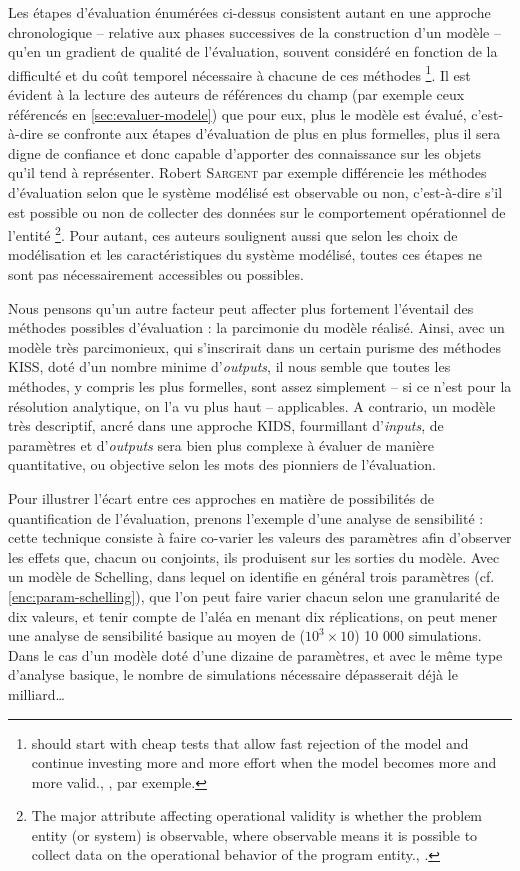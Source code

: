 Les étapes d'évaluation énumérées ci-dessus consistent autant en une approche chronologique -- relative aux phases successives de la construction d'un modèle -- qu'en un gradient de qualité de l'évaluation, souvent considéré en fonction de la difficulté et du coût temporel nécessaire à chacune de ces méthodes
\footnote{
	\og [One] should start with cheap tests that allow fast rejection of the model and continue investing more and more effort when the model becomes more and more valid.\fg{}, \textcite[42]{klugl_validation_2008}, par exemple.
}.
Il est évident à la lecture des auteurs de références du champ (par exemple ceux référencés en \cref{sec:evaluer-modele}) que pour eux, \og plus\fg{} le modèle est évalué, c'est-à-dire se confronte aux étapes d'évaluation de plus en plus formelles, plus il sera digne de confiance et donc capable d'apporter des connaissance sur les objets qu'il tend à représenter.
Robert \textsc{Sargent} par exemple différencie les méthodes d'évaluation selon que le système modélisé est observable ou non, c'est-à-dire \og s'il est possible ou non de collecter des données sur le comportement opérationnel de l'entité \fg{}
\footnote{
	\og The major attribute affecting operational validity is whether the problem entity (or system) is observable, where observable means it is possible to collect data on the operational behavior of the program entity.\fg{}, \textcite[6]{sargent2009verification}.
}.
Pour autant, ces auteurs soulignent aussi que selon les choix de modélisation et les caractéristiques du système modélisé, toutes ces étapes ne sont pas nécessairement accessibles ou possibles.

Nous pensons qu'un autre facteur peut affecter plus fortement l'éventail des méthodes possibles d'évaluation : la parcimonie du modèle réalisé.
Ainsi, avec un modèle très parcimonieux, qui s'inscrirait dans un certain purisme des méthodes \og KISS\fg{}, doté d'un nombre minime d'\textit{outputs}, il nous semble que toutes les méthodes, y compris les plus formelles, sont assez simplement -- si ce n'est pour la résolution analytique, on l'a vu plus haut -- applicables.
A contrario, un modèle très descriptif, ancré dans une approche \og KIDS\fg{}, fourmillant d'\textit{inputs}, de paramètres et d'\textit{outputs} sera bien plus complexe à évaluer de manière quantitative, ou \og objective\fg{} selon les mots des pionniers de l'évaluation.

Pour illustrer l'écart entre ces approches en matière de possibilités de quantification de l'évaluation, prenons l'exemple d'une analyse de sensibilité :
	cette technique consiste à faire co-varier les valeurs des paramètres afin d'observer les effets que, chacun ou conjoints, ils produisent sur les sorties du modèle.
Avec un modèle de Schelling, dans lequel on identifie en général trois paramètres (cf. \cref{enc:param-schelling}), que l'on peut faire varier chacun selon une granularité de dix valeurs, et tenir compte de l'aléa en menant dix réplications, on peut mener une analyse de sensibilité basique au moyen de ($10^3 \times 10$) 10 000 simulations.
Dans le cas d'un modèle doté d'une dizaine de paramètres, et avec le même type d'analyse basique, le nombre de simulations nécessaire dépasserait déjà le milliard\ldots


